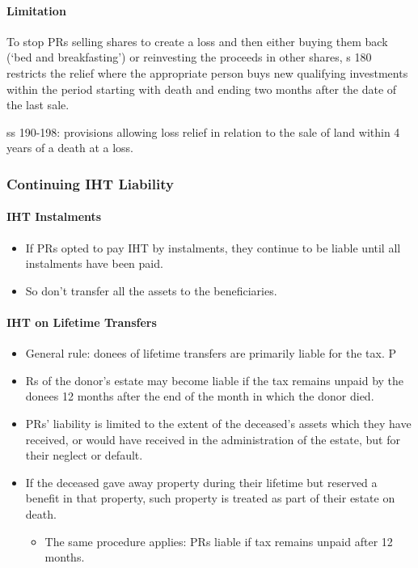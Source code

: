\documentclass[
]{article}
\providecommand{\tightlist}{%
  \setlength{\itemsep}{0pt}\setlength{\parskip}{0pt}}
\begin{document}
\hypertarget{limitation}{%
\paragraph{Limitation}\label{limitation}}

To stop PRs selling shares to create a loss and then either buying them
back (`bed and breakfasting') or reinvesting the proceeds in other
shares, s 180 restricts the relief where the appropriate person buys new
qualifying investments within the period starting with death and ending
two months after the date of the last sale.

ss 190-198: provisions allowing loss relief in relation to the sale of
land within 4 years of a death at a loss.

\hypertarget{continuing-iht-liability}{%
\subsubsection{Continuing IHT
Liability}\label{continuing-iht-liability}}

\hypertarget{iht-instalments}{%
\paragraph{IHT Instalments}\label{iht-instalments}}

\begin{itemize}
\tightlist
\item
  If PRs opted to pay IHT by instalments, they continue to be liable
  until all instalments have been paid.
\item
  So don't transfer all the assets to the beneficiaries.
\end{itemize}

\hypertarget{iht-on-lifetime-transfers}{%
\paragraph{IHT on Lifetime Transfers}\label{iht-on-lifetime-transfers}}

\begin{itemize}
\tightlist
\item
  General rule: donees of lifetime transfers are primarily liable for
  the tax. P
\item
  Rs of the donor's estate may become liable if the tax remains unpaid
  by the donees 12 months after the end of the month in which the donor
  died.
\item
  PRs' liability is limited to the extent of the deceased's assets which
  they have received, or would have received in the administration of
  the estate, but for their neglect or default.
\item
  If the deceased gave away property during their lifetime but reserved
  a benefit in that property, such property is treated as part of their
  estate on death.

  \begin{itemize}
  \tightlist
  \item
    The same procedure applies: PRs liable if tax remains unpaid after
    12 months.
  \end{itemize}
\end{itemize}
\end{document}
